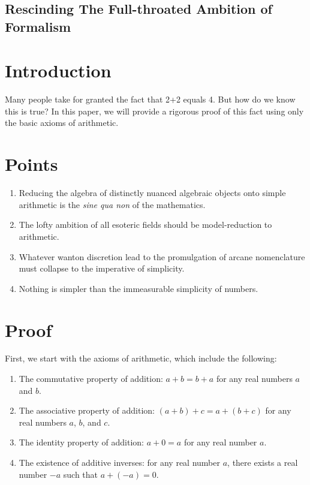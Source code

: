 \subsection{Rescinding The Full-throated Ambition of Formalism}

\section{Introduction}
Many people take for granted the fact that 2+2 equals 4. But how do we know
this is true? In this paper, we will provide a rigorous proof of this fact
using only the basic axioms of arithmetic.

\section{Points}
\begin{enumerate}
    \item Reducing the algebra of distinctly nuanced algebraic objects onto simple
          arithmetic is the \textit{sine qua non} of the mathematics.
    \item The lofty ambition of all esoteric fields should be model-reduction to
          arithmetic.
    \item Whatever wanton discretion lead to the promulgation of arcane nomenclature must
          collapse to the imperative of simplicity.
    \item Nothing is simpler than the immeasurable simplicity of numbers.
\end{enumerate}

\section{Proof}
First, we start with the axioms of arithmetic, which include the following:
\begin{enumerate}
    \item The commutative property of addition: $a+b=b+a$ for any real numbers $a$ and
          $b$.
    \item The associative property of addition: $(a+b)+c=a+(b+c)$ for any real numbers
          $a$, $b$, and $c$.
    \item The identity property of addition: $a+0=a$ for any real number $a$.
    \item The existence of additive inverses: for any real number $a$, there exists a
          real number $-a$ such that $a+(-a)=0$.
\end{enumerate}

